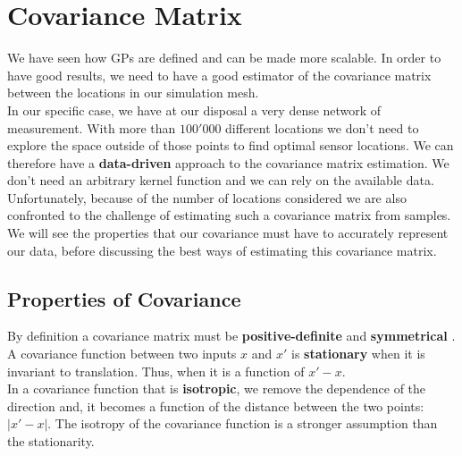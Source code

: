 \section{Covariance Matrix} \label{sec:cov_est}

We have seen how GPs are defined and can be made more scalable. In order to have good results, we need to have a good estimator of the covariance matrix between the locations in our simulation mesh. \\


In our specific case, we have at our disposal a very dense network of measurement. With more than $100'000$ different locations we don't need to explore the space outside of those points to find optimal sensor locations. We can therefore have a \textbf{data-driven} approach to the covariance matrix estimation. We don't need an arbitrary kernel function and we can rely on the available data. Unfortunately, because of the number of locations considered we are also confronted to the challenge of estimating such a covariance matrix from samples. \\

We will see the properties that our covariance must have to accurately represent our data, before discussing the best ways of estimating this covariance matrix.


\subsection{Properties of Covariance}

By definition a covariance matrix must be \textbf{positive-definite} and \textbf{symmetrical} \citep[p.~80]{rasmussen_gaussian_2006}. \\

A covariance function between two inputs $x$ and $x'$ is \textbf{stationary}   when it is invariant to translation. Thus, when it is a function of $x' - x$. \\
In a covariance function that is \textbf{isotropic}, we remove the dependence of the direction and, it becomes a function of the distance between the two points: $|x' - x|$. The isotropy of the covariance function is a stronger assumption than the stationarity. \\ 

